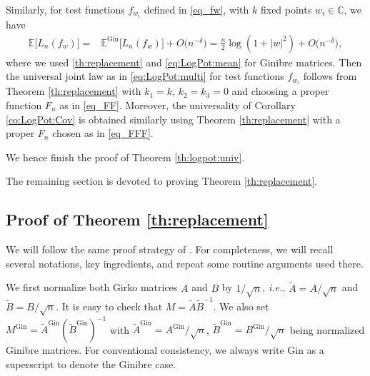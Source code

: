 \documentclass[10pt,reqno]{amsart}
\numberwithin{equation}{section}
\numberwithin{figure}{section}
\theoremstyle{plain}
\newcommand{\C}{{\mathbb{C}}}
\newcommand{\A}{{\tilde{A}}}
\newcommand{\B}{{\tilde{B}}}
\newcommand{\<}{\langle}
\renewcommand{\>}{\rangle}
\newcommand{\AG}{A^{\mathrm{Gin}}}
\newcommand{\BG}{B^{\mathrm{Gin}}}
\newcommand{\MG}{M^{\mathrm{Gin}}}
\newcommand{\E}{\mathbb{E}}
\newcommand{\ie}{\emph{i.e., }}
\begin{document}
    


Similarly, for test functions $f_{w_i}$ defined in \eqref{eq_fw}, with $k$ fixed points $w_i \in \C$, we have  
\begin{align}\label{eq_mean_1}
\E\big[L_n(f_{w})\big]=&\E^{\mathrm{Gin}}\big[L_n(f_{w})\big]+O\big( n^{-\delta}\big)=\frac{n}{2} \log (1+|w|^2)+O\big( n^{-\delta}\big),	
\end{align}
where we used \eqref{th:replacement} and \eqref{eq:LogPot:mean} for Ginibre matrices. Then the universal joint law as in \eqref{eq:LogPot:multi} for test functions $f_{w_i}$ follows from Theorem \ref{th:replacement} with $k_1=k$, $k_2=k_3=0$ and choosing a proper function $F_n$ as in \eqref{eq_FF}. Moreover, the universality of Corollary \ref{co:LogPot:Cov} is obtained similarly using Theorem \ref{th:replacement} with a proper $F_n$ chosen as in \eqref{eq_FFF}.  


We hence finish the proof of Theorem \ref{th:logpot:univ}.
















%
%
%
%
%
%
%
%














%
%
%
%
%
%
%
%
%
%


%

\medskip


The remaining section is devoted to proving Theorem \ref{th:replacement}.


\subsection{Proof of Theorem \ref{th:replacement}}


We will follow the same proof strategy of \cite[Theorem 4.1]{chafai-garcia-zelada-xu}. For completeness, we will recall several notations, key ingredients, and repeat some routine arguments used there.


We first normalize both Girko matrices $A$ and $B$ by $1/\sqrt{n}$, \ie $\A=A/\sqrt{n}$ and $\B=B/\sqrt{n}$. It is easy to check that $M=\A \B^{-1}$. We also set $\MG={\tilde A}^{\mathrm{Gin}}({\tilde B}^{\mathrm{Gin}})^{-1}$ with ${\tilde A}^{\mathrm{Gin}}=\AG/\sqrt{n}$, ${\tilde B}^{\mathrm{Gin}}=\BG/\sqrt{n}$ being normalized Ginibre matrices. For conventional consistency, we always write $\mathrm{Gin}$ as a superscript to denote the Ginibre case. 
 
\end{document}
